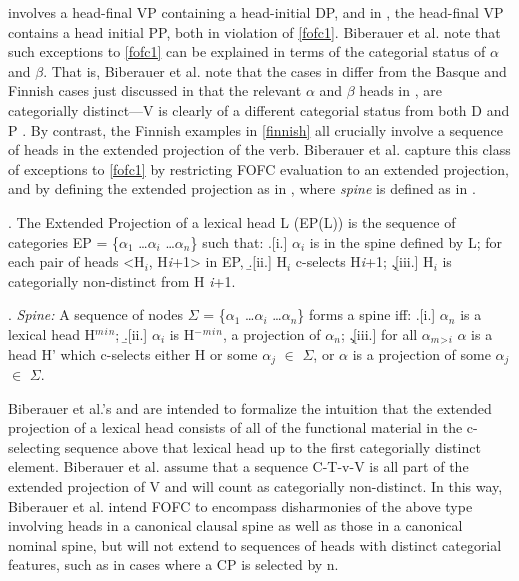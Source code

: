 \documentclass[output=paper]{langscibook}
\begin{document}
\Last[a] involves a head-final VP containing a head-initial DP, and in \Last[b], the head-final VP contains a head initial PP, both in violation of \protect\ref{fofc1}. Biberauer et al. note that such exceptions to \protect\ref{fofc1} can be explained in terms of the categorial status of $\alpha$ and $\beta$.  That is, Biberauer et al. note that the cases in \Last differ from the Basque and Finnish cases just discussed in that the relevant $\alpha$ and $\beta$ heads in \Last, are categorially distinct---V is clearly of a different categorial status from both D \Last[a] and P \Last[b].  By contrast, the Finnish examples in \protect\ref{finnish} all crucially involve a sequence of heads in the extended projection of the verb.   Biberauer et al. capture this class of exceptions to \protect\ref{fofc1} by restricting FOFC evaluation to an extended projection, and by defining the extended projection as in \Next, where \textit{spine} is defined as in \NNext.

\ex. The Extended Projection of a lexical head L (EP(L)) is the sequence of categories EP = \{$\alpha_1$ \ldots $\alpha_i$ \ldots $\alpha_n$\} such that:  \protect\label{fofc4}
\a.[i.]  $\alpha_i$ is in the spine defined by L; for each pair of heads <H$_i$, H\scriptsize \textit{i}+1\normalsize> in EP, 
\b.[ii.] H$_i$ c-selects H\scriptsize \textit{i}+1\normalsize ; 
\c.[iii.] H$_i$ is categorially non-distinct from H \scriptsize \textit{i}+1\normalsize.


\ex. \textit{Spine:} A sequence of nodes $\Sigma$ = \{$\alpha_1$ \ldots $\alpha_i$ \ldots $\alpha_n$\}  forms a spine iff:  \protect\label{fofc5}
\a.[i.]  $\alpha$$_n$  is a lexical head H$^m$$^i$$^n$;
\b.[ii.] $\alpha$$_i$ is H$^-$$^m$$^i$$^n$, a projection of $\alpha_n$;
\c.[iii.] for all $\alpha_m$$_>$$_i$  $\alpha$ is a head H' which c-selects either H or some $\alpha_j$ $\in$ $\Sigma$, or $\alpha$ is a projection of some $\alpha_j$ $\in$ $\Sigma$.


Biberauer et al.'s \LLast and \Last are intended to formalize the intuition that the extended projection of a lexical head consists of all of the functional material in the c-selecting sequence above that lexical head up to the first categorially distinct element.  Biberauer et al. assume that a sequence C-T-v-V is all part of the extended projection of V and will count as categorially non-distinct. In this way, Biberauer et al. intend FOFC to encompass disharmonies of the above type involving heads in a canonical clausal spine as well as those in a canonical nominal spine, but will not extend to sequences of heads with distinct categorial features, such as in cases where a CP is selected by n.
\end{document}
